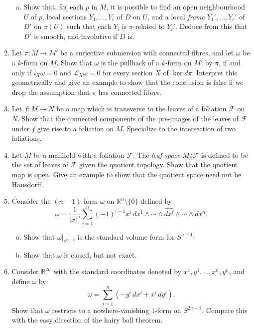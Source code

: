 \documentclass[11pt]{article} %
\begin{document}
\begin{enumerate}
\begin{enumerate}[(a)]
		\item Show that, for each $p$ in $M$, it is possible to find an open neighbourhood $U$ of $p$, local sections $Y_1, \dots, Y_r$ of $D$ on $U$, and a local \emph{frame} $Y_1', \dots, Y_r'$ of $D'$ on $\pi(U)$ such that each $Y_i$ is $\pi$-related to $Y_i'$. Deduce from this that $D'$ is smooth, and involutive if $D$ is. 
	\end{enumerate}

	\item Let $\pi\colon M \to M'$ be a surjective submersion with connected fibres, and let $\omega$ be a $k$-form on $M$. Show that $\omega$ is the pullback of a $k$-form on $M'$ by $\pi$, if and only if $i_X\omega = 0$ and $\mathcal{L}_X\omega = 0$ for every section $X$ of $\ker d\pi$. Interpret this geometrically and give an example to show that the conclusion is false if we drop the assumption that $\pi$ has connected fibres.

	\item Let $f\colon M \to N$ be a map which is transverse to the leaves of a foliation $\mathcal{F}$ on $N$. Show that the connected components of the pre-images of the leaves of $\mathcal{F}$ under $f$ give rise to a foliation on $M$. Specialize to the intersection of two foliations.

	\item Let $M$ be a manifold with a foliation $\mathcal{F}$. The \emph{leaf space} $M/\mathcal{F}$ is defined to be the set of leaves of $\mathcal{F}$ given the quotient topology. Show that the quotient map is open. Give an example to show that the quotient space need not be Hausdorff.

	\item Consider the $(n - 1)$-form $\omega$ on $\mathbb{R}^n \setminus \{0\}$ defined by 
	\[
		\omega = \frac{1}{|x|^n} \sum_{i=1}^n (-1)^{i - 1} x^i \, dx^1 \wedge \cdots \wedge \widehat{dx^i} \wedge \cdots \wedge dx^n.
	\]
	\begin{enumerate}[(a)]
		\item Show that $\omega|_{S^{n-1}}$ is the standard volume form for $S^{n-1}$.
		\item Show that $\omega$ is closed, but not exact.
	\end{enumerate}

	\item Consider $\mathbb{R}^{2n}$ with the standard coordinates denoted by $x^1,y^1,\dots,x^n,y^n$, and define $\omega$ by 
	\[
		\omega = \sum_{i=1}^n \left(-y^i \, dx^i + x^i \, dy^i \right).
	\]
	Show that $\omega$ restricts to a nowhere-vanishing $1$-form on $S^{2n - 1}$. Compare this with the easy direction of the hairy ball theorem.


\end{enumerate}
\end{document}
